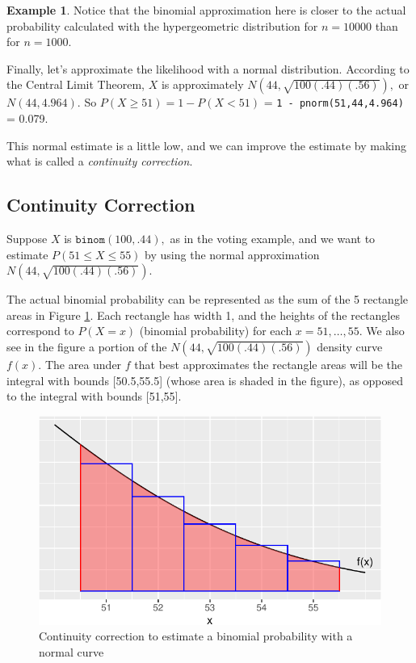 \documentclass[
]{book}
\theoremstyle{definition}
\theoremstyle{definition}
\newtheorem{example}{Example}[chapter]
\theoremstyle{definition}
\theoremstyle{definition}
\theoremstyle{remark}
\begin{document}
\begin{example}
Notice that the binomial approximation here is closer to the actual probability calculated with the hypergeometric distribution for \(n = 10000\) than for \(n = 1000\).

Finally, let's approximate the likelihood with a normal distribution.
According to the Central Limit Theorem, \(X\) is approximately \(N(44,\sqrt{100(.44)(.56)}),\) or \(N(44,4.964)\).
So \(P(X \geq 51) = 1 - P(X < 51)\) = \texttt{1\ -\ pnorm(51,44,4.964)} = 0.079.

This normal estimate is a little low, and we can improve the estimate by making what is called a \emph{continuity correction}.
\end{example}

\subsection*{Continuity Correction}\label{continuity-correction}

Suppose \(X\) is \(\texttt{binom}(100,.44),\) as in the voting example, and we want to estimate \(P(51 \leq X \leq 55)\) by using the normal approximation \(N(44,\sqrt{100(.44)(.56)})\).

The actual binomial probability can be represented as the sum of the 5 rectangle areas in Figure \ref{fig:continuity-correction}.
Each rectangle has width 1, and the heights of the rectangles correspond to \(P(X = x)\) (binomial probability) for each \(x = 51,\ldots,55.\)
We also see in the figure a portion of the \(N(44,\sqrt{100(.44)(.56)})\) density curve \(f(x)\). The area under \(f\) that best approximates the rectangle areas will be the integral with bounds {[}50.5,55.5{]} (whose area is shaded in the figure), as opposed to the integral with bounds {[}51,55{]}.

\begin{figure}
\centering
\includegraphics{math340-notes_files/figure-latex/continuity-correction-1.pdf}
\caption{\label{fig:continuity-correction}Continuity correction to estimate a binomial probability with a normal curve}
\end{figure}
\end{document}

